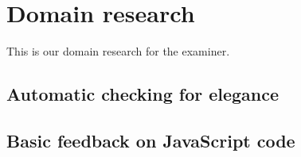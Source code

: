 \part{Domain research}
This is our domain research for the \gls{examiner}.

\chapter{Automatic checking for elegance}


\chapter{Basic feedback on JavaScript code}


